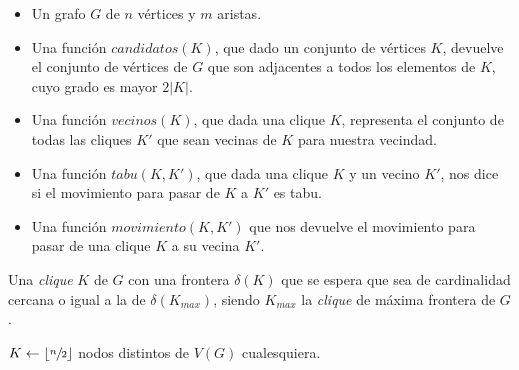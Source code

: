 \bigskip

\begin{pseudocodigo}
    \Require\Statex
        \begin{itemize}
            \item Un grafo $G$ de $n$ v\'ertices y $m$ aristas.

            \item Una funci\'on $candidatos(K)$, que dado un conjunto de v\'ertices
                $K$, devuelve el conjunto de v\'ertices de $G$ que son adjacentes
                a todos los elementos de $K$, cuyo grado es mayor $2|K|$.

            \item Una funci\'on $vecinos(K)$, que dada una clique $K$, representa
                el conjunto de todas las cliques $K'$ que sean vecinas de $K$ para
                nuestra vecindad.

            \item Una funci\'on $tabu(K,K')$, que dada una clique $K$ y un vecino $K'$,
                nos dice si el movimiento para pasar de $K$ a $K'$ es tabu.

            \item Una funci\'on $movimiento(K,K')$ que nos devuelve el movimiento
                para pasar de una clique $K$ a su vecina $K'$.
        \end{itemize}
    \Statex
    \Ensure Una \emph{clique} $K$ de $G$ con una frontera $\delta(K)$ que se
        espera que sea de cardinalidad cercana o igual a la de $\delta(K_{max})$,
        siendo $K_{max}$ la \emph{clique} de m\'axima frontera de $G$.

    \Statex

        \State $K \gets \lfloor\sfrac{n}{2}\rfloor$ nodos distintos de $V(G)$ cualesquiera.
        \Statex


\end{pseudocodigo}
